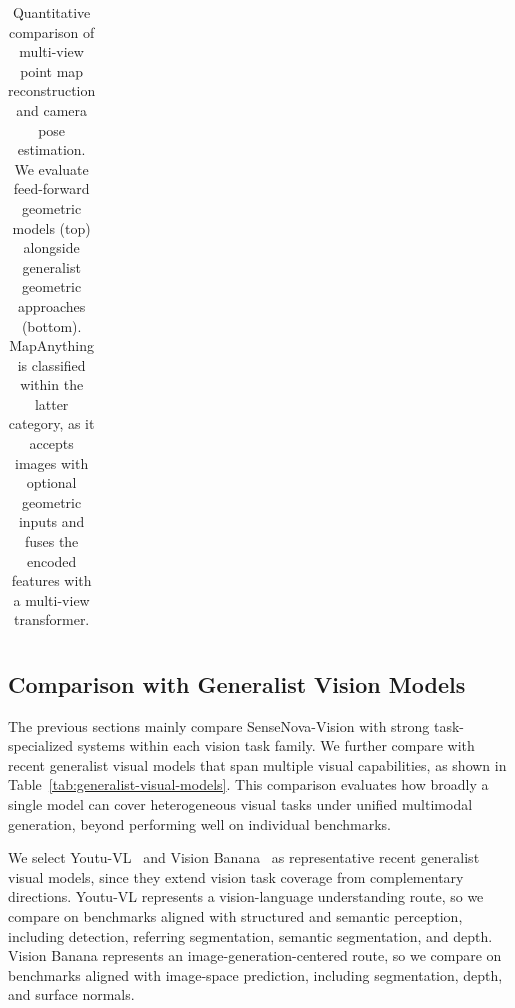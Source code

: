 \begin{table}[t]
\begin{tabular}{l|cc|cc}
        \bottomrule
    \end{tabular}
    \caption{Quantitative comparison of multi-view point map reconstruction and camera pose estimation.
        We evaluate feed-forward geometric models (top) alongside generalist geometric approaches (bottom).
        MapAnything is classified within the latter category, as it accepts images with optional geometric inputs and fuses the encoded features with a multi-view transformer.
    }
    \label{tab:multiview-results}
\end{table}

\subsection{Comparison with Generalist Vision Models}

The previous sections mainly compare SenseNova-Vision with strong task-specialized systems within each vision task family.
We further compare with recent generalist visual models that span multiple visual capabilities, as shown in Table~\ref{tab:generalist-visual-models}.
This comparison evaluates how broadly a single model can cover heterogeneous visual tasks under unified multimodal generation, beyond performing well on individual benchmarks.

We select Youtu-VL~\cite{youtuvl} and Vision Banana~\cite{visionbanana} as representative recent generalist visual models, since they extend vision task coverage from complementary directions.
Youtu-VL represents a vision-language understanding route, so we compare on benchmarks aligned with structured and semantic perception, including detection, referring segmentation, semantic segmentation, and depth.
Vision Banana represents an image-generation-centered route, so we compare on benchmarks aligned with image-space prediction, including segmentation, depth, and surface normals.

